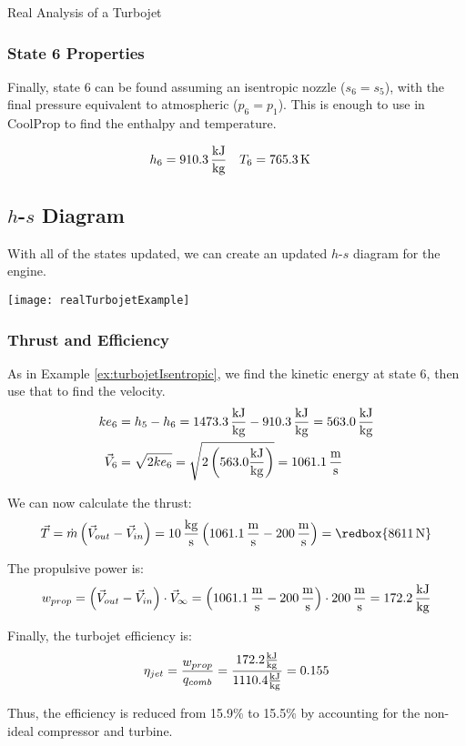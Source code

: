 \begin{example}[label=ex:turbojetReal]{Real Analysis of a Turbojet}
  \subsubsection*{State 6 Properties}
  Finally, state 6 can be found assuming an isentropic nozzle ($s_6=s_5$), with the final pressure equivalent to atmospheric ($p_6=p_1$).  This is enough to use in CoolProp to find the enthalpy and temperature.
  
  \begin{align*}
    h_6 &= 910.3\, \frac{\rm kJ}{\rm kg} &  T_6 &= 765.3 {\rm\, K}
  \end{align*}

  \subsection*{$h$-$s$ Diagram}
  With all of the states updated, we can create an updated $h$-$s$ diagram for the engine.
  \begin{center}
    \texttt{[image: realTurbojetExample]}
  \end{center}
  
  
  \subsubsection*{Thrust and Efficiency}
  As in Example \ref{ex:turbojetIsentropic}, we find the kinetic energy at state 6, then use that to find the velocity.
  \begin{align*}
    ke_6 & = h_5 - h_6 = 1473.3\, \frac{\rm kJ}{\rm kg} - 910.3\, \frac{\rm kJ}{\rm kg} = 563.0\, \frac{\rm kJ}{\rm kg} \\
    \vec{V}_6 &= \sqrt{2 ke_6} = \sqrt{2 \left(563.0 \frac{\rm kJ}{\rm kg}\right)} = 1061.1\, \frac{\rm m}{\rm s}
  \end{align*}

  We can now calculate the thrust:
  \begin{equation*}
    \vec{T} = \dot{m} \left(\vec{V}_{out} - \vec{V}_{in}\right) = 10\, \frac{\rm kg}{\rm s} \left(1061.1\, \frac{\rm m}{\rm s} - 200\, \frac{\rm m}{\rm s}\right) = \redbox{8611\, \rm N}
  \end{equation*}

  The propulsive power is:
  \begin{equation*}
    w_{prop} =  \left(\vec{V}_{out} - \vec{V}_{in}\right) \cdot \vec{V}_{\infty} = \left(1061.1\, \frac{\rm m}{\rm s} - 200\, \frac{\rm m}{\rm s}\right) \cdot 200 \, \frac{\rm m}{\rm s} = 172.2\, \frac{\rm kJ}{\rm kg}
  \end{equation*}

  Finally, the turbojet efficiency is:
  \begin{equation*}
    \eta_{jet} = \frac{w_{prop}}{q_{comb}} = \frac{172.2 \frac{\rm kJ}{\rm kg}}{1110.4 \frac{\rm kJ}{\rm kg}} = 0.155
  \end{equation*}

  Thus, the efficiency is reduced from 15.9\% to 15.5\% by accounting for the non-ideal compressor and turbine.
  
\end{example}
